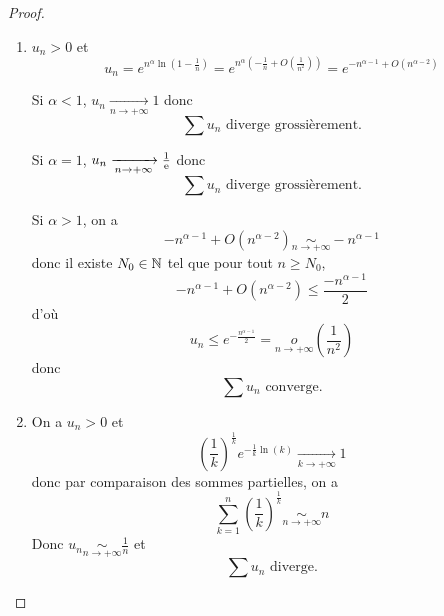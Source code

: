 \documentclass[12pt]{article}
\begin{document}
\begin{proof}
	\phantom{}
	\begin{enumerate}
		\item $u_{n}>0$ et 
		\begin{equation*}u_{n}=e^{n^{\alpha}\ln\left(1-\frac{1}{n}\right)}=e^{n^{\alpha}\left(-\frac{1}{n}+O\left(\frac{1}{n^{2}}\right)\right)}=e^{-n^{\alpha-1}+O\left(n^{\alpha-2}\right)}\end{equation*}

		Si $\alpha<1$, $u_{n}\xrightarrow[n\to+\infty]{}1$ donc 
		\begin{equation*}\boxed{\sum u_{n}\text{ diverge grossièrement.}}\end{equation*}

		Si $\alpha=1$, $u_{n}\xrightarrow[n\to+\infty]{}\frac{1}{\mathrm{e}}$ donc 
		\begin{equation*}\boxed{\sum u_{n}\text{ diverge grossièrement.}}\end{equation*}

		Si $\alpha>1$, on a 
		\begin{equation*}-n^{\alpha-1}+O\left(n^{\alpha-2}\right)\underset{n\to+\infty}{\sim}-n^{\alpha-1}\end{equation*}
		donc il existe $N_{0}\in\mathbb{N}$ tel que pour tout $n\geqslant N_{0}$,
		\begin{equation*}-n^{\alpha-1}+O\left(n^{\alpha-2}\right)\leqslant\frac{-n^{\alpha-1}}{2}\end{equation*}
		d'où 
		\begin{equation*}u_{n}\leqslant e^{-\frac{n^{\alpha-1}}{2}}=\underset{n\to+\infty}{o}\left(\frac{1}{n^{2}}\right)\end{equation*}
		donc 
		\begin{equation*}\boxed{\sum u_{n}\text{ converge.}}\end{equation*}

		\item On a $u_{n}>0$ et 
		\begin{equation*}\left(\frac{1}{k}\right)^{\frac{1}{k}}e^{-\frac{1}{k}\ln(k)}\xrightarrow[k\to+\infty]{}1\end{equation*}
		donc par comparaison des sommes partielles, on a 
		\begin{equation*}\sum_{k=1}^{n}\left(\frac{1}{k}\right)^{\frac{1}{k}}\underset{n\to+\infty}{\sim}n\end{equation*}
		Donc $u_{n}\underset{n\to+\infty}{\sim}\frac{1}{n}$ et 
		\begin{equation*}\boxed{\sum u_{n}\text{ diverge.}}\end{equation*}


\end{enumerate}
\end{proof}
\end{document}
